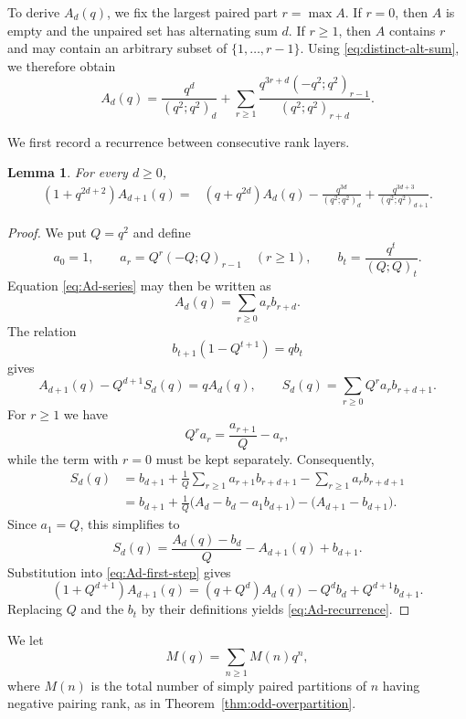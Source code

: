\documentclass[11pt]{article}
\newtheorem{lemma}[theorem]{Lemma}
\theoremstyle{definition}
\theoremstyle{remark}
\begin{document}
To derive $A_d(q)$, we fix the largest paired part $r=\max A$.  If $r=0$, then $A$ is empty and the unpaired set has alternating sum $d$.  If $r\geq1$, then $A$ contains $r$ and may contain an arbitrary subset of $\{1,\ldots,r-1\}$.  Using \eqref{eq:distinct-alt-sum}, we therefore obtain
\begin{equation}\label{eq:Ad-series}
 A_d(q)
 =\frac{q^d}{(q^2;q^2)_d}
 +\sum_{r\geq1}
 \frac{q^{3r+d}(-q^2;q^2)_{r-1}}
 {(q^2;q^2)_{r+d}}.
\end{equation}

We first record a recurrence between consecutive rank layers.

\begin{lemma}\label{lem:Ad-recurrence}
For every $d\geq0$,
\begin{align}
 (1+q^{2d+2})A_{d+1}(q)
 ={}&(q+q^{2d})A_d(q)
 -\frac{q^{3d}}{(q^2;q^2)_d}
 +\frac{q^{3d+3}}{(q^2;q^2)_{d+1}}.
 \label{eq:Ad-recurrence}
\end{align}
\end{lemma}

\begin{proof}
We put $Q=q^2$ and define
\[
 a_0=1,
 \qquad
 a_r=Q^r(-Q;Q)_{r-1}\quad(r\geq1),
 \qquad
 b_t=\frac{q^t}{(Q;Q)_t}.
\]
Equation \eqref{eq:Ad-series} may then be written as
\[
 A_d(q)=\sum_{r\geq0}a_rb_{r+d}.
\]
The relation
\[
 b_{t+1}(1-Q^{t+1})=qb_t
\]
gives
\begin{equation}\label{eq:Ad-first-step}
 A_{d+1}(q)-Q^{d+1}S_d(q)=qA_d(q),
 \qquad
 S_d(q)=\sum_{r\geq0}Q^ra_rb_{r+d+1}.
\end{equation}
For $r\geq1$ we have
\[
 Q^ra_r=\frac{a_{r+1}}{Q}-a_r,
\]
while the term with $r=0$ must be kept separately.  Consequently,
\begin{align*}
 S_d(q)
 & =b_{d+1}
 +\frac1Q\sum_{r\geq1}a_{r+1}b_{r+d+1}
 -\sum_{r\geq1}a_rb_{r+d+1}\\
 & =b_{d+1}
 +\frac1Q\bigl(A_d-b_d-a_1b_{d+1}\bigr)
 -\bigl(A_{d+1}-b_{d+1}\bigr).
\end{align*}
Since $a_1=Q$, this simplifies to
\[
 S_d(q)=\frac{A_d(q)-b_d}{Q}-A_{d+1}(q)+b_{d+1}.
\]
Substitution into \eqref{eq:Ad-first-step} gives
\[
 (1+Q^{d+1})A_{d+1}(q)
 =(q+Q^d)A_d(q)-Q^db_d+Q^{d+1}b_{d+1}.
\]
Replacing $Q$ and the $b_t$ by their definitions yields \eqref{eq:Ad-recurrence}.
\end{proof}

We let
\[
 M(q)=\sum_{n\geq1}M(n)q^n,
\]
where $M(n)$ is the total number of simply paired partitions of $n$ having negative pairing rank, as in Theorem~\ref{thm:odd-overpartition}.
\end{document}
